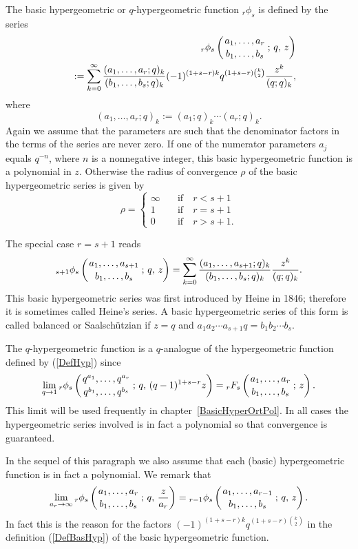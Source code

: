 \documentclass[envcountchap,graybox]{svmono}
\newcommand{\hyp}[5]{\mbox{}_{#1}{F}_{#2}
\left(\genfrac{}{}{0pt}{}{#3}{#4}\,;\,#5\right)}
\newcommand{\qhyp}[5]{\mbox{}_{#1}{\phi}_{#2}
\left(\genfrac{}{}{0pt}{}{#3}{#4}\,;\,q,\,#5\right)}
\begin{document}
The basic hypergeometric or $q$-hypergeometric function $\mbox{}_r\phi_s$ is defined by the series
\begin{eqnarray}
\label{DefBasHyp}\index{Basic hypergeometric function}
& &\qhyp{r}{s}{a_1,\ldots,a_r}{b_1,\ldots,b_s}{z}\nonumber\\
& &{}:=\sum\limits_{k=0}^{\infty}\frac{(a_1,\ldots,a_r;q)_k}{(b_1,\ldots,b_s;q)_k}
(-1)^{(1+s-r)k}q^{(1+s-r)\binom{k}{2}}\frac{z^k}{(q;q)_k},
\end{eqnarray}
where
$$(a_1,\ldots,a_r;q)_k:=(a_1;q)_k\cdots(a_r;q)_k.$$
Again we assume that the parameters are such that the denominator factors
in the terms of the series are never zero. If one of the numerator
parameters $a_j$ equals $q^{-n}$, where $n$ is a nonnegative integer, this
basic hypergeometric function is a polynomial in $z$. Otherwise the radius of
convergence $\rho$ of the basic hypergeometric series is given by
$$\rho=\left\{\begin{array}{ll}
\displaystyle \infty & \quad\textrm{if}\quad r < s+1\\[5mm]
\displaystyle 1 & \quad\textrm{if}\quad r = s+1\\[5mm]
\displaystyle 0 & \quad\textrm{if}\quad r > s+1.\end{array}\right.$$

The special case $r=s+1$ reads
$$\qhyp{s+1}{s}{a_1,\ldots,a_{s+1}}{b_1,\ldots,b_s}{z}=
\sum\limits_{k=0}^{\infty}\frac{(a_1,\ldots,a_{s+1};q)_k}{(b_1,\ldots,b_s;q)_k}
\frac{z^k}{(q;q)_k}.$$
This basic hypergeometric series was first introduced by Heine in 1846; therefore it is
sometimes called Heine's series. A basic hypergeometric series of
this form is called balanced
or Saalsch\"{u}tzian if $z=q$ and
$a_1a_2 \cdots a_{s+1}q=b_1b_2 \cdots b_s$.

The $q$-hypergeometric function is a $q$-analogue of the hypergeometric function
defined by (\ref{DefHyp}) since
$$\lim\limits_{q\rightarrow 1}
\qhyp{r}{s}{q^{a_1},\ldots,q^{a_r}}{q^{b_1},\ldots,q^{b_s}}{(q-1)^{1+s-r}z}
=\hyp{r}{s}{a_1,\ldots,a_r}{b_1,\ldots,b_s}{z}.$$
This limit will be used frequently in chapter~\ref{BasicHyperOrtPol}. In all
cases the hypergeometric series involved is in fact a polynomial so that
convergence is guaranteed.

In the sequel of this paragraph we also assume that each (basic) hypergeometric
function is in fact a polynomial. We remark that
$$\lim\limits_{a_r\rightarrow\infty}
\qhyp{r}{s}{a_1,\ldots,a_r}{b_1,\ldots,b_s}{\frac{z}{a_r}}=
\qhyp{r-1}{s}{a_1,\ldots,a_{r-1}}{b_1,\ldots,b_s}{z}.$$
In fact this is the reason for the factors
$(-1)^{(1+s-r)k}q^{(1+s-r)\binom{k}{2}}$ in the definition (\ref{DefBasHyp})
of the basic hypergeometric function.
\end{document}
